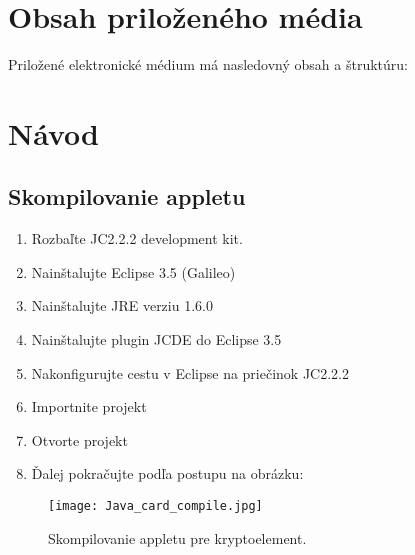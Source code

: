 \documentclass[12pt,a4wide,oneside,openright]{report}
\begin{document}
\newpage
{}
\chapter{Obsah priloženého média}
Priložené elektronické médium má nasledovný obsah a štruktúru:





\chapter{Návod} \label{s_manual}
 
\section{Skompilovanie appletu} \label{s_applet_compile}

	\begin{enumerate}
		\item Rozbaľte JC2.2.2 development kit.
		\item Nainštalujte Eclipse 3.5 (Galileo)
		\item Nainštalujte JRE verziu 1.6.0
		\item Nainštalujte plugin JCDE do Eclipse 3.5
		\item Nakonfigurujte cestu v Eclipse na priečinok JC2.2.2
		\item Importnite projekt
		\item Otvorte projekt
		\item Ďalej pokračujte podľa postupu na obrázku:
	\end{enumerate}
	
	\begin{figure*}[h]
		\centering
		\texttt{[image: Java\_card\_compile.jpg]}
		\caption{Skompilovanie appletu pre kryptoelement.}
		\label{f:applet_compile}
	\end{figure*}
	
\end{document}
